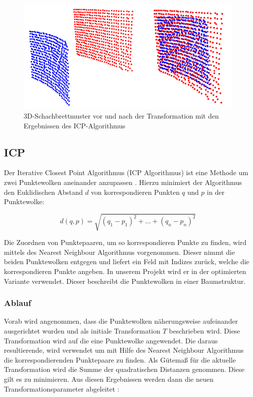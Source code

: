 \begin{figure}[H]
	\includegraphics[scale=1.0]{bilder/icpresult}
	\caption[3D-Schachbrettmuster vor und nach der Transformation mit den Ergebnissen des ICP-Algorithmus]{3D-Schachbrettmuster vor und nach der Transformation mit den Ergebnissen des ICP-Algorithmus}
	\label{fig:icpresult}
\end{figure}

\subsection{ICP}
\label{sec:icp}

Der Iterative Closest Point Algorithmus (ICP Algorithmus) ist eine Methode um zwei Punktewolken aneinander anzupassen \cite{icp1} \cite{icp2}.
Hierzu minimiert der Algorithmus den Euklidischen Abstand $d$ von korrespondieren Punkten $q$ und $p$ in der Punktewolke:

\begin{equation}
d(q,p) = \sqrt{(q_{1}-p_{1})^{2} + ... + 
	(q_{n} -p_{n})^{2}}
\end{equation}

\noindent Die Zuordnen von Punktepaaren, um so korrespondieren Punkte zu finden, wird mittels des Nearest Neighbour Algorithmus vorgenommen. Dieser nimmt die beiden Punktewolken entgegen und liefert ein Feld mit Indizes zurück, welche die korrespondieren Punkte angeben. In unserem Projekt wird er in der optimierten Variante verwendet. Dieser beschreibt die Punktewolken in einer Baumstruktur.

\subsubsection{Ablauf}
\label{ss:ablauf}

Vorab wird angenommen, dass die Punktewolken näherungsweise aufeinander ausgerichtet wurden und als
initiale Transformation $T$ beschrieben wird. Diese Transformation wird auf die eine Punktewolke angewendet. Die daraus resultierende, wird verwendet um mit Hilfe des Nearest Neighbour Algorithmus die korrespondierenden Punktepaare zu finden. 
Als Gütemaß für die aktuelle Transformation wird die Summe der quadratischen Distanzen genommen. Diese gilt es zu minimieren. Aus diesen Ergebnissen werden dann die neuen Transformationsparameter abgeleitet \cite{icp3}:

